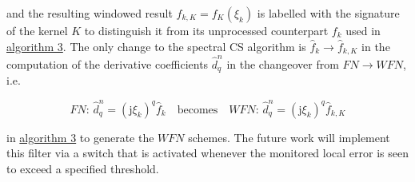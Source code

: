 \documentclass[11pt,titlepage]{report}
\begin{document}
\noindent and the resulting windowed result $f_{k,K} = f_K(\xi_k)$ is labelled with the signature of the kernel $K$ to distinguish it from its unprocessed counterpart $f_k$ used in \hyperlink{alg:3}{algorithm 3}. The only change to the spectral CS algorithm is $\hat{f}_{k} \rightarrow \hat{f}_{k,K}$ in the computation of the derivative coefficients $\hat{d}_q^n$ in the changeover from $FN\rightarrow WFN$, i.e.

$$FN: \, \hat{d}_q^n = (\text{j}\xi_k)^q\hat{f}_k \quad \text{becomes} \quad WFN:\,\hat{d}_q^n = (\text{j}\xi_k)^q\hat{f}_{k,K}$$

\noindent in \hyperlink{alg:3}{algorithm 3} to generate the $WFN$ schemes. The future work will implement this filter via a switch that is activated whenever the monitored local error is seen to exceed a specified threshold.





\end{document}

